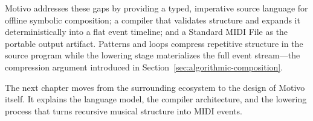Motivo addresses these gaps by providing a typed, imperative source language for offline symbolic composition;
a compiler that validates structure and expands it deterministically into a flat event timeline; and a Standard MIDI
File as the portable output artifact.
Patterns and loops compress repetitive structure in the source program while the lowering stage materializes the full
event stream---the compression argument introduced in Section~\ref{sec:algorithmic-composition}.

The next chapter moves from the surrounding ecosystem to the design of Motivo itself. It explains the
language model, the compiler architecture, and the lowering process that turns recursive musical structure
into MIDI events.
